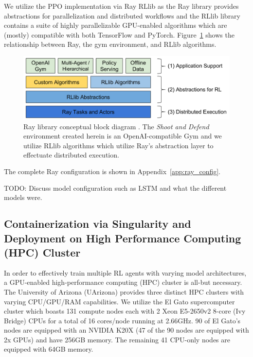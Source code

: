 \documentclass{article}
\begin{document}
\noindent
We utilize the PPO implementation via Ray RLlib \cite{ray_ppo} as the Ray library provides abstractions for parallelization and distributed workflows and the RLlib library contains a suite of highly parallelizable GPU-enabled algorithms which are (mostly) compatible with both TensorFlow and PyTorch. 
Figure~\ref{fig:ray_blockdiagram} shows the relationship between Ray, the gym environment, and RLlib algorithms. 

\begin{figure}
  \includegraphics[width=\linewidth]{imgs/ray_blockdiagram}
  \caption{Ray library conceptual block diagram \cite{ray_ppo}. The \textit{Shoot and Defend} environment created herein is an OpenAI-compatible Gym and we utilize RLlib algorithms which utilize Ray's abstraction layer to effectuate distributed execution.}
  \label{fig:ray_blockdiagram}
\end{figure}

\noindent 
The complete Ray configuration is shown in Appendix~\ref{app:ray_config}.  

TODO: Discuss model configuration such as LSTM and what the different models were.

\subsection{Containerization via Singularity and Deployment on High Performance Computing (HPC) Cluster}\label{container_hpc}
In order to effectively train multiple RL agents with varying model architectures, a GPU-enabled  high-performance computing (HPC) cluster is all-but necessary. 
The University of Arizona (UArizona) provides three distinct HPC clusters with varying CPU/GPU/RAM capabilities. 
We utilize the El Gato supercomputer cluster which boasts 131 compute nodes each with 2 Xeon E5-2650v2 8-core (Ivy Bridge) CPUs for a total of 16 cores/node running at 2.66GHz. 
90 of El Gato’s nodes are equipped with an NVIDIA K20X (47 of the 90 nodes are equipped with 2x GPUs) and have 256GB memory. 
The remaining 41 CPU-only nodes are equipped with 64GB memory. \\ 
\end{document}
